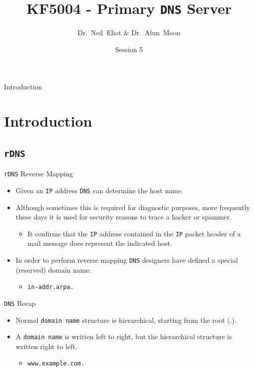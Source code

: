\documentclass[xcolor=table,aspectratio=169]{beamer}
\title{KF5004 - Primary \texttt{DNS} Server}
\author{Dr.~Neil~Eliot \& Dr.~Alun~Moon}
\institute[Northumbria University] %
{
  Department of Computer and Information Sciences\\
  University of Northumbria
}
\date{Session 5}
\begin{document}
\begin{frame}
  \titlepage
\end{frame}

\begin{frame}{Introduction}
  \tableofcontents
\end{frame}


\section{Introduction}
\subsection{\texttt{rDNS}}
\begin{frame}{\texttt{rDNS} Reverse Mapping}
  \begin{itemize}
    \item Given an \texttt{IP} address \texttt{DNS} can determine the host name.
    \item Although sometimes this is required for diagnostic purposes, more frequently these days it is used for security reasons to trace a hacker or spammer.
      \begin{itemize}
        \item It confirms that the \texttt{IP} address contained in the \texttt{IP} packet header of a mail message does represent the indicated host.
      \end{itemize}
    \item In order to perform reverse mapping \texttt{DNS} designers have defined a special (reserved) domain name.
    \begin{itemize}
      \item \texttt{in-addr.arpa.}
    \end{itemize}
\end{itemize}
\end{frame}

\begin{frame}{\texttt{DNS} Recap}
  \begin{itemize}
    \item Normal \texttt{domain name} structure is hierarchical, starting from the root (.).
    \item A \texttt{domain name} is written left to right, but the hierarchical structure is written right to left.
      \begin{itemize}
        \item \texttt{www.example.com.}
      \end{itemize}
  \end{itemize}
\end{frame}
\end{document}
